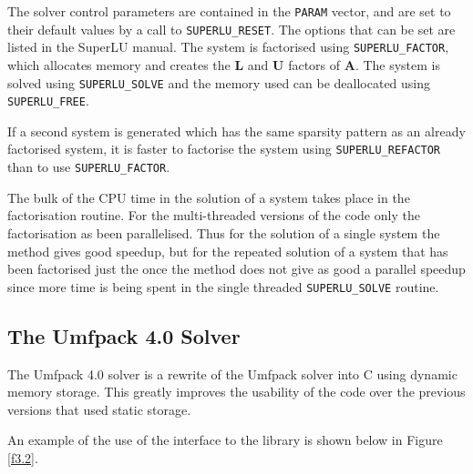 The solver control parameters are contained in the {\tt PARAM} vector, and are
set to their default values by a call to {\tt SUPERLU\_RESET}. The options
that can be set are listed in the SuperLU manual. The system is factorised 
using {\tt SUPERLU\_FACTOR}, which allocates memory and creates the 
$\mathbf{L}$ and $\mathbf{U}$ factors of $\mathbf{A}$. The system is solved 
using {\tt SUPERLU\_SOLVE} and the memory used can be deallocated using 
{\tt SUPERLU\_FREE}.

If a second system is generated which has the same sparsity pattern as an
already factorised system, it is faster to factorise the system using 
{\tt SUPERLU\_REFACTOR} than to use {\tt SUPERLU\_FACTOR}.

The bulk of the CPU time in the solution of a system takes place in the 
factorisation routine. For the multi-threaded versions of the code only the 
factorisation as been parallelised. Thus for the solution of a single system 
the method gives good speedup, but for the repeated solution of a system 
that has been factorised just the once the method does not give as good
a parallel speedup since more time is being spent in the single threaded 
{\tt SUPERLU\_SOLVE} routine.

\clearpage


\subsection{The Umfpack 4.0 Solver}\label{s3.2}

The Umfpack 4.0 solver is a rewrite of the Umfpack solver into C using dynamic 
memory storage. This greatly improves the usability of the code over the 
previous versions that used static storage.

An example of the use of the interface to the library is shown below in 
Figure \ref{f3.2}.

